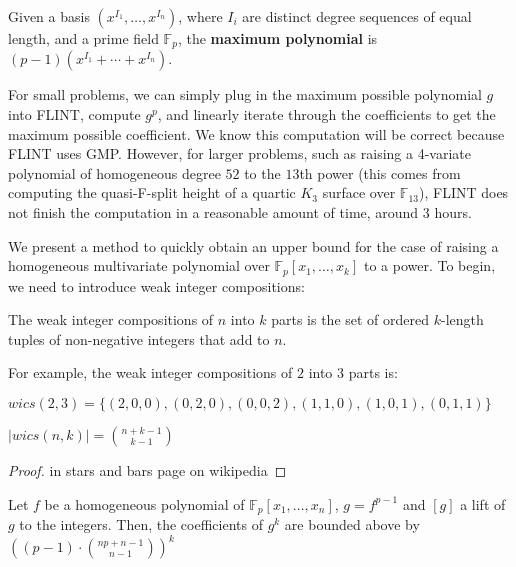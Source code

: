 \begin{defn}
    Given a basis $(x^{I_1}, \dots, x^{I_n})$, where $I_i$ are distinct degree sequences of equal length, and a prime field $\mathbb{F}_p$, the \textbf{maximum polynomial} is $(p - 1)(x^{I_1} + \cdots + x^{I_n})$.
\end{defn}

For small problems, we can simply plug in the maximum possible polynomial $g$ into FLINT, compute $g ^ p$, and linearly iterate through the coefficients to get the maximum possible coefficient.
We know this computation will be correct because FLINT uses GMP. However, for larger problems, such as raising a 4-variate polynomial of homogeneous degree $52$ to the $13$th power (this comes from computing the quasi-F-split height of a quartic $K_3$ surface over $\mathbb{F}_{13}$), FLINT does not finish the computation in a reasonable amount of time, around 3 hours.

We present a method to quickly obtain an upper bound for the case of raising a homogeneous multivariate polynomial over $\mathbb{F}_p[x_1, \dots , x_k]$ to a power. To begin, we need to introduce weak integer compositions:

\begin{defn}
    The weak integer compositions of $n$ into $k$ parts is the set of ordered $k$-length tuples of non-negative integers that add to $n$.
\end{defn}

For example, the weak integer compositions of $2$ into $3$ parts is:
\begin{center}
    $wics(2, 3) = \lbrace (2, 0, 0), (0, 2, 0), (0, 0, 2), (1, 1, 0), (1, 0, 1), (0, 1, 1) \rbrace$
\end{center}

\begin{lem}
    $|wics(n, k)| = \binom{n + k - 1}{k - 1}$
\end{lem}

\begin{proof}
    in stars and bars page on wikipedia
\end{proof}

\begin{thm}
    Let $f$ be a homogeneous polynomial of $\mathbb{F}_p[x_1, ..., x_n]$, $g = f ^ {p - 1}$ and $[g]$ a lift of $g$ to the integers. Then, the coefficients of $g ^ k$ are bounded above by $((p - 1) \cdot \binom{np + n - 1}{n - 1}) ^ k$
\end{thm}

